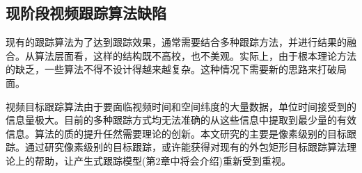 \subsection{现阶段视频跟踪算法缺陷}
现有的跟踪算法为了达到跟踪效果，通常需要结合多种跟踪方法，并进行结果的融合。从算法层面看，这样的结构既不高校，也不美观。实际上，由于根本理论方法的缺乏，一些算法不得不设计得越来越复杂。这种情况下需要新的思路来打破局面。
\par
视频目标跟踪算法由于要面临视频时间和空间纬度的大量数据，单位时间接受到的信息量极大。目前的多种跟踪方式均无法准确的从这些信息中提取到最少量的有效信息。算法的质的提升任然需要理论的创新。本文研究的主要是像素级别的目标跟踪。通过研究像素级别的目标跟踪，或许能获得对现有的外包矩形目标跟踪算法理论上的帮助，让产生式跟踪模型(第2章中将会介绍)重新受到重视。

